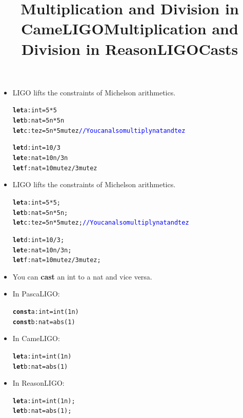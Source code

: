 \documentclass[wide]{slides}
\newcommand{\Kconst}[0]{\textbf{const}\xspace}
\newcommand{\Klet}[0]{\textbf{let}\xspace}
\newcommand{\com}[1]{\textcolor{blue}{{#1}}}
\begin{document}
\begin{slide}
  \title{Multiplication and Division in CameLIGO}

  \begin{itemize}

    \item LIGO lifts the constraints of Michelson arithmetics.

      \begin{alltt}
\Klet a : int = 5 * 5
\Klet b : nat = 5n * 5n
\Klet c : tez = 5n * 5mutez \com{// You can also multiply nat and tez}

\Klet d : int = 10 / 3
\Klet e : nat = 10n / 3n
\Klet f : nat = 10mutez / 3mutez
      \end{alltt}

  \end{itemize}

\end{slide}

\begin{slide}
  \title{Multiplication and Division in ReasonLIGO}

  \begin{itemize}

    \item LIGO lifts the constraints of Michelson arithmetics.

      \begin{alltt}
\Klet a : int = 5 * 5;
\Klet b : nat = 5n * 5n;
\Klet c : tez = 5n * 5mutez; \com{// You can also multiply nat and tez}

\Klet d : int = 10 / 3;
\Klet e : nat = 10n / 3n;
\Klet f : nat = 10mutez / 3mutez;
      \end{alltt}
  \end{itemize}

\end{slide}

\begin{slide}
  \title{Casts}

  \begin{itemize}

    \item You can \textbf{cast} an \textsf{int} to a \textsf{nat} and
      vice versa.

    \item In PascaLIGO:
      \begin{alltt}
\Kconst a : int = int (1n)
\Kconst b : nat = abs (1)
      \end{alltt}

    \item In CameLIGO:
      \begin{alltt}
\Klet a : int = int (1n)
\Klet b : nat = abs (1)
      \end{alltt}

    \item In ReasonLIGO:
      \begin{alltt}
\Klet a : int = int (1n);
\Klet b : nat = abs (1);
      \end{alltt}
  \end{itemize}

\end{slide}
\end{document}
